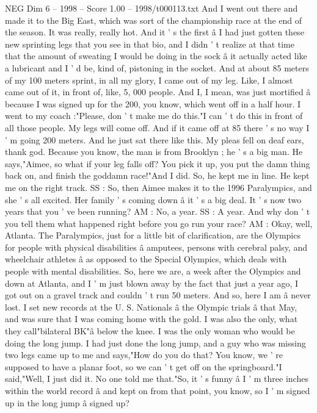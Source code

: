 \begin{textsample}{NEG Dim 6 – 1998 – Score 1.00 – 1998/t000113.txt}
And I went out there and made it to the Big East, which was sort of the championship race at the end of the season.
It was really, really hot.
And it ' s the first â I had just gotten these new sprinting legs that you see in that bio, and I didn ' t realize at that time that the amount of sweating I would be doing in the sock â it actually acted like a lubricant and I ' d be, kind of, pistoning in the socket.
And at about 85 meters of my 100 meters sprint, in all my glory, I came out of my leg.
Like, I almost came out of it, in front of, like, 5, 000 people.
And I, I mean, was just mortified â because I was signed up for the 200, you know, which went off in a half hour.
I went to my coach :"Please, don ' t make me do this."I can ' t do this in front of all those people.
My legs will come off.
And if it came off at 85 there ' s no way I ' m going 200 meters.
And he just sat there like this.
My pleas fell on deaf ears, thank god.
Because you know, the man is from Brooklyn ; he ' s a big man.
He says,"Aimee, so what if your leg falls off?
You pick it up, you put the damn thing back on, and finish the goddamn race!"And I did.
So, he kept me in line.
He kept me on the right track.
SS : So, then Aimee makes it to the 1996 Paralympics, and she ' s all excited.
Her family ' s coming down â it ' s a big deal.
It ' s now two years that you ' ve been running?
AM : No, a year.
SS : A year.
And why don ' t you tell them what happened right before you go run your race?
AM : Okay, well, Atlanta.
The Paralympics, just for a little bit of clarification, are the Olympics for people with physical disabilities â amputees, persons with cerebral palsy, and wheelchair athletes â as opposed to the Special Olympics, which deals with people with mental disabilities.
So, here we are, a week after the Olympics and down at Atlanta, and I ' m just blown away by the fact that just a year ago, I got out on a gravel track and couldn ' t run 50 meters.
And so, here I am â never lost.
I set new records at the U.
S.
Nationals â the Olympic trials â that May, and was sure that I was coming home with the gold.
I was also the only, what they call"bilateral BK"â below the knee.
I was the only woman who would be doing the long jump.
I had just done the long jump, and a guy who was missing two legs came up to me and says,"How do you do that?
You know, we ' re supposed to have a planar foot, so we can ' t get off on the springboard."I said,"Well, I just did it.
No one told me that."So, it ' s funny â I ' m three inches within the world record â and kept on from that point, you know, so I ' m signed up in the long jump â signed up?

\end{textsample}
